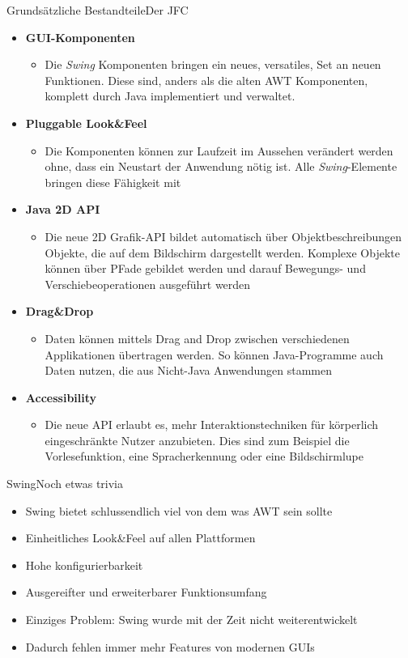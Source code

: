 \begin{frame}[allowframebreaks]{Grundsätzliche Bestandteile}{Der JFC}
	\begin{itemize}
		\item \textbf{GUI-Komponenten}
		\begin{itemize}
			\item Die \textit{Swing} Komponenten bringen ein neues, versatiles, Set an neuen Funktionen. Diese sind, anders als die alten AWT Komponenten, komplett durch Java implementiert und verwaltet.
		\end{itemize}
		\item \textbf{Pluggable Look\&Feel}
		\begin{itemize}
			\item Die Komponenten können zur Laufzeit im Aussehen verändert werden ohne, dass ein Neustart der Anwendung nötig ist. Alle \textit{Swing}-Elemente bringen diese Fähigkeit mit
		\end{itemize}
		\item \textbf{Java 2D API}
		\begin{itemize}
			\item Die neue 2D Grafik-API bildet automatisch über Objektbeschreibungen Objekte, die auf dem Bildschirm dargestellt werden. Komplexe Objekte können über PFade gebildet werden und darauf Bewegungs- und Verschiebeoperationen ausgeführt werden
		\end{itemize}
		\item \textbf{Drag\&Drop}
		\begin{itemize}
			\item Daten können mittels Drag and Drop zwischen verschiedenen Applikationen übertragen werden. So können Java-Programme auch Daten nutzen, die aus Nicht-Java Anwendungen stammen
		\end{itemize}
		\item \textbf{Accessibility}
		\begin{itemize}
			\item Die neue API erlaubt es, mehr Interaktionstechniken für körperlich eingeschränkte Nutzer anzubieten. Dies sind zum Beispiel die Vorlesefunktion, eine Spracherkennung oder eine Bildschirmlupe
		\end{itemize}
	\end{itemize}
\end{frame}

\begin{frame}{Swing}{Noch etwas trivia}
	\begin{itemize}
		\item Swing bietet schlussendlich viel von dem was AWT sein sollte
		\item Einheitliches Look\&Feel auf allen Plattformen
		\item Hohe konfigurierbarkeit
		\item Ausgereifter und erweiterbarer Funktionsumfang
		\item Einziges Problem: Swing wurde mit der Zeit nicht weiterentwickelt
		\item Dadurch fehlen immer mehr Features von modernen GUIs
	\end{itemize}
\end{frame}

